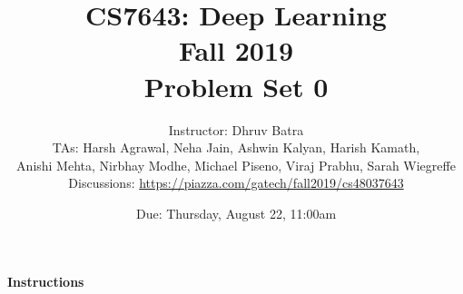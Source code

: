 \documentclass[11pt,english, answers]{exam}
\begin{document}
\title{CS7643: Deep Learning\\
Fall 2019 \\
Problem Set 0}
\author{Instructor: Dhruv Batra \\
TAs: Harsh Agrawal, Neha Jain, Ashwin Kalyan, Harish Kamath, \\Anishi Mehta, Nirbhay Modhe, Michael Piseno, Viraj Prabhu, Sarah Wiegreffe\\
Discussions: \url{https://piazza.com/gatech/fall2019/cs48037643}}
\date{Due: Thursday, August 22, 11:00am}

\maketitle

\paragraph*{Instructions}
\end{document}
